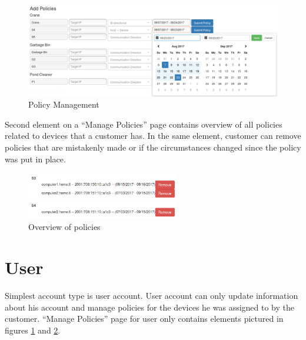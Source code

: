 \begin{figure}[ht]
	\begin{center}
		\includegraphics[width=\textwidth]{images/implementation/ManagePolicies}
		\caption{Policy Management}
		\label{fig:ManagePolicies}
	\end{center}
\end{figure}

Second element on a ``Manage Policies'' page contains overview of all policies related to devices that a customer has. In the same element, customer can remove policies that are mistakenly made or if the circumstances changed since the policy was put in place.

\begin{figure}[ht]
	\begin{center}
		\includegraphics[width=0.6\textwidth]{images/implementation/PolicyOverview}
		\caption{Overview of policies}
		\label{fig:PolicyOverview}
	\end{center}
\end{figure}

\section{User}

Simplest account type is user account. User account can only update information about his account and manage policies for the devices he was assigned to by the customer. ``Manage Policies'' page for user only contains elements pictured in figures \ref{fig:ManagePolicies} and \ref{fig:PolicyOverview}.




